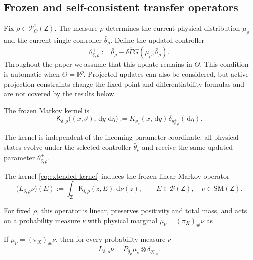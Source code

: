 \documentclass[11pt]{article}
\theoremstyle{definition}
\theoremstyle{remark}
\newcommand{\SM}{\mathrm{SM}}
\newcommand{\ProbThetaOne}{\mathcal{P}_{\Theta}^{1}}
\newcommand{\Lin}{L}
\newcommand{\dd}{\,\mathrm{d}}
\newcommand{\ThetaSet}{\Theta}
\newcommand{\Gammahat}{\widehat{\Gamma}}
\newcommand{\Z}{\mathsf{Z}}
\begin{document}
\subsection{Frozen and self-consistent transfer operators}\label{2.3}

Fix \(\rho\in\ProbThetaOne(\Z)\).  The measure \(\rho\) determines the current
physical distribution \(\mu_\rho\) and the current single controller
\(\bar\theta_\rho\).  Define the updated controller
\begin{equation}
  \theta^+_{\delta,\rho}
  :=\bar\theta_\rho
    -\delta\Gammahat G(\mu_\rho,\bar\theta_\rho).
  \label{eq:barycentric-update}
\end{equation}
Throughout the paper we assume that this update remains in \(\ThetaSet\). This condition is automatic when $\ThetaSet=\mathbb R^p$.
Projected updates can also be considered, but active projection constraints
change the fixed-point and differentiability formulas and are not covered by
the results below.

The frozen Markov kernel is
\begin{equation}
  \boxed{
  \mathsf K_{\delta,\rho}
  \bigl((x,\vartheta),\dd y\,\dd\eta\bigr)
  :=K_{\bar\theta_\rho}(x,\dd y)\,
    \delta_{\theta^+_{\delta,\rho}}(\dd\eta).}
  \label{eq:extended-kernel}
\end{equation}


The kernel is independent of the incoming parameter coordinate:
all physical states evolve under the selected controller
$\bar\theta_\rho$ and receive the same updated parameter
$\theta_{\delta,\rho}^{+}$.





The kernel \eqref{eq:extended-kernel} induces the frozen linear Markov operator
\begin{equation}
  \bigl(\Lin_{\delta,\rho}\nu\bigr)(E)
  :=\int_{\Z}
       \mathsf K_{\delta,\rho}(z,E)\,\dd\nu(z),
  \qquad
  E\in\mathcal B(\Z),\quad \nu\in\SM(\Z).
  \label{eq:frozen-extended-operator}
\end{equation}




For fixed $\rho$, this operator is linear, preserves positivity
and total mass, and acts on a probability measure $\nu$ with
physical marginal $\mu_\nu=(\pi_X)_\#\nu$ as


If
\(\mu_\nu=(\pi_X)_\#\nu\), then for every probability measure \(\nu\)
\begin{equation}
  \boxed{
  \Lin_{\delta,\rho}\nu
  =P_{\bar\theta_\rho}\mu_\nu
   \otimes\delta_{\theta^+_{\delta,\rho}}.}
  \label{eq:frozen-explicit-action}
\end{equation}
\end{document}
